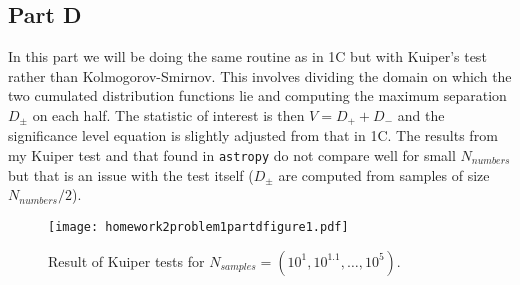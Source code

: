 \subsection{Part D}

In this part we will be doing the same routine as in 1C but with Kuiper's test rather than Kolmogorov-Smirnov. This involves dividing the domain on which the two cumulated distribution functions lie and computing the maximum separation $D_{\pm}$ on each half. The statistic of interest is then $V = D_{+} + D_{-}$ and the significance level equation is slightly adjusted from that in 1C. The results from my Kuiper test and that found in \texttt{astropy} do not compare well for small $N_{numbers}$ but that is an issue with the test itself ($D_{\pm}$ are computed from samples of size $N_{numbers}/2$). 



\clearpage

\begin{figure}[h]
    \centering
    \texttt{[image: homework2problem1partdfigure1.pdf]}
    \caption{Result of Kuiper tests for $N_{samples} = (10^{1}, 10^{1.1}, \dots, 10^{5})$.}
    \label{fig:21d1}
\end{figure}

\clearpage
